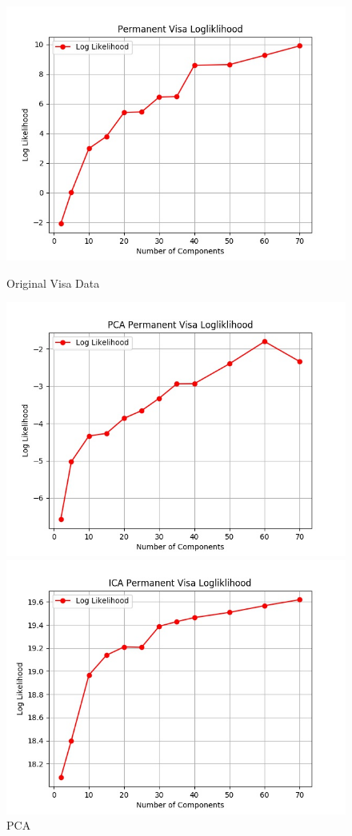 \documentclass[h]{article}
\begin{document}
 \begin{figure}[H]
      \includegraphics[width=1\textwidth,keepaspectratio]{permanent_visa_logliklihood.jpg} 
      \caption*{Original Visa Data} 
   \endminipage\hfill
      \includegraphics[width=1\textwidth,keepaspectratio]{pca_permanent_visa_logliklihood.jpg} 
      \caption*{PCA} 
   \endminipage\hfill
      \includegraphics[width=1\textwidth,keepaspectratio]{ica_permanent_visa_logliklihood.jpg} 

\end{figure}
\end{document}
